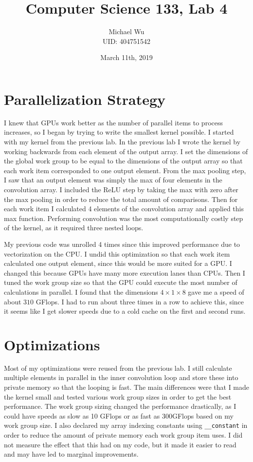 \documentclass[12pt]{article}
\begin{document}
\title{Computer Science 133, Lab 4}
\date{March 11th, 2019}
\author{Michael Wu\\UID: 404751542}
\maketitle

\section{Parallelization Strategy}

I knew that GPUs work better as the number of parallel items to process increases,
so I began by trying to write the smallest kernel possible. I started with my kernel
from the previous lab. In the previous lab I wrote the kernel by working backwards from each element of the
output array. I set the dimensions of the global work group to be equal to the dimensions of the output
array so that each work item corresponded to one output element. From the max pooling step, I saw that an output
element was simply the max of four elements in the convolution array. I included the ReLU step by taking the max
with zero after the max pooling in order to reduce the total amount of comparisons. Then for each work item
I calculated 4 elements of the convolution array and applied this max function. Performing convolution was
the most computationally costly step of the kernel, as it required three nested loops.

My previous code was unrolled 4 times since this improved performance due to vectorization on the CPU. I undid
this optimization so that each work item calculated one output element, since this would be more suited for a GPU.
I changed this because GPUs have many more execution lanes than CPUs. Then I tuned the work group size so
that the GPU could execute the most number of calculations in parallel. I found that the dimensions
\(4\times 1\times 8\) gave me a speed of about \(310\) GFlops. I had to run about three times in a row to achieve this,
since it seems like I get slower speeds due to a cold cache on the first and second runs.

\section{Optimizations}

Most of my optimizations were reused from the previous lab. I still calculate multiple elements in parallel in the inner
convolution loop and store these into private memory so that the looping is fast. The main differences were
that I made the kernel small and tested various work group sizes in order to get the best performance. The work group sizing changed the
performance drastically, as I could have speeds as slow as 10 GFlops or as fast as 300GFlops based on my work group size.
I also declared my array indexing constants using \texttt{\_\_constant} in order to reduce the amount of private memory each
work group item uses. I did not measure the effect that this had on my code, but it made it easier to read and may have led
to marginal improvements.
\end{document}
